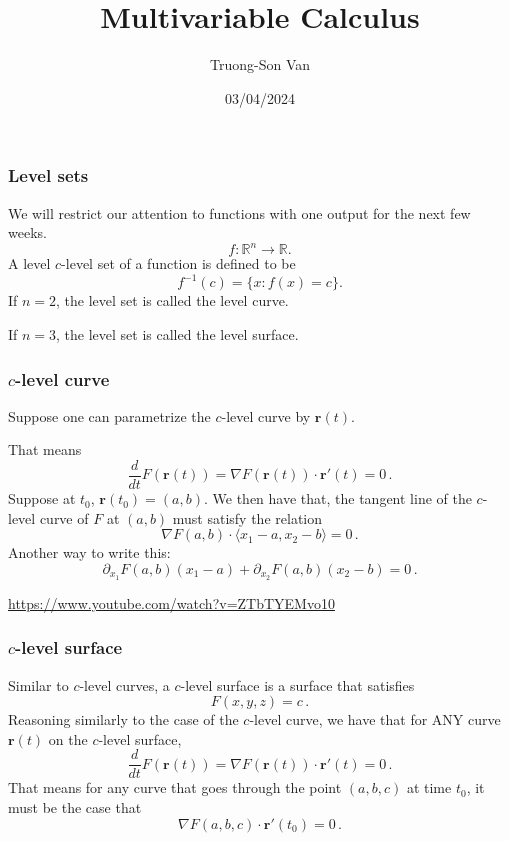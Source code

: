 \documentclass[aspectratio=169]{beamer}
\title{ Multivariable Calculus }
\institute{Fulbright University Vietnam}
\author{Truong-Son Van}
\date{03/04/2024}
\newcommand{\vect}{\mathbf}
\newcommand{\R}{\mathbb{R}}
\begin{document}
\maketitle

\begin{frame}
    \frametitle{Level sets}
    We will restrict our attention to functions with one output for the next few weeks.
    $$f : \R^n \to \R.$$
    A level $c$-level set of a function is defined to be
    $$ f^{-1}(c) = \{ x: f(x) = c  \}.$$
    If $n = 2$, the level set is called the level curve.

    If $n = 3$, the level set is called the level surface.
\end{frame}

\begin{frame}
    \frametitle{ $c$-level curve }
    Suppose one can parametrize the $c$-level curve by $\vect{r}(t)$.

    That means 
    \begin{equation*}
        \frac{d}{dt} F(\vect{r}(t)) = \nabla F (\vect{r}(t)) \cdot \vect{r}'(t)= 0 \,.
    \end{equation*}
    Suppose at $t_0$, $\vect{r}(t_0) = ( a,b )$.
    We then have that, the tangent line of the $c$-level curve of $F$ at $(a,b)$
    must satisfy the relation
    \begin{equation*}
        \nabla F(a,b) \cdot \langle x_1 - a, x_2 - b \rangle = 0\,.
    \end{equation*}
    Another way to write this:
    \begin{equation*}
        \partial_{x_1} F (a,b) (x_1 -a ) + \partial_{x_2} F(a,b) (x_2 - b) = 0\,.
    \end{equation*}

    \url{https://www.youtube.com/watch?v=ZTbTYEMvo10}

\end{frame}

\begin{frame}
    \frametitle{$c$-level surface}
    Similar to $c$-level curves, a $c$-level surface is a surface that satisfies
    \begin{equation*}
        F(x,y,z) = c \,.
    \end{equation*}
    Reasoning similarly to the case of the $c$-level curve, we have that
    for ANY curve $\vect{r}(t)$ on the $c$-level surface,
    \begin{equation*}
        \frac{d}{dt} F(\vect{r}(t)) = \nabla F (\vect{r}(t)) \cdot \vect{r}'(t)= 0  \,.
    \end{equation*}
    That means for any curve that goes through the point $(a,b,c)$ at time $t_0$, it must be the case that
    \begin{equation*}
        \nabla F(a,b,c) \cdot \vect{r}'(t_0) = 0 \,.
    \end{equation*}
\end{frame}
\end{document}
